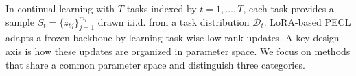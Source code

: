 \documentclass{article}
\theoremstyle{plain}
\theoremstyle{definition}
\theoremstyle{remark}
\begin{document}




In continual learning with \(T\) tasks indexed by \(t=1,\dots,T\), each task provides a sample \(S_t =\{z_{tj}\}_{j=1}^{m_t}\) drawn i.i.d. from a task distribution \(\mathcal{D}_t\). LoRA-based PECL adapts a frozen backbone by learning task-wise low-rank updates. A key design axis is how these updates are organized in parameter space. We focus on methods that share a common parameter space and distinguish three categories.
\end{document}
